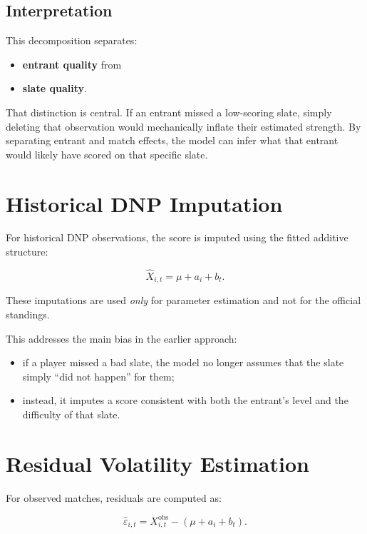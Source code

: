 \documentclass[11pt]{article}
\begin{document}
\subsection{Interpretation}

This decomposition separates:
\begin{itemize}[itemsep=2pt]
    \item \textbf{entrant quality} from
    \item \textbf{slate quality}.
\end{itemize}

That distinction is central. If an entrant missed a low-scoring slate, simply deleting that observation would mechanically inflate their estimated strength. By separating entrant and match effects, the model can infer what that entrant would likely have scored on that specific slate.

\section{Historical DNP Imputation}

For historical DNP observations, the score is imputed using the fitted additive structure:

\begin{equation}
\hat{X}_{i,t} = \mu + a_i + b_t.
\end{equation}

These imputations are used \emph{only} for parameter estimation and not for the official standings.

This addresses the main bias in the earlier approach:
\begin{itemize}[itemsep=2pt]
    \item if a player missed a bad slate, the model no longer assumes that the slate simply ``did not happen'' for them;
    \item instead, it imputes a score consistent with both the entrant's level and the difficulty of that slate.
\end{itemize}

\section{Residual Volatility Estimation}

For observed matches, residuals are computed as:

\begin{equation}
\hat{\varepsilon}_{i,t} = X_{i,t}^{\text{obs}} - (\mu + a_i + b_t).
\end{equation}
\end{document}
